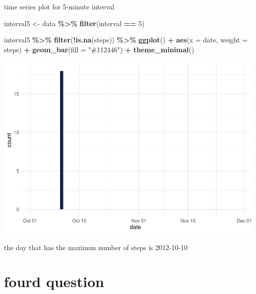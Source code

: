 \documentclass[
]{article}
\newenvironment{Shaded}{\begin{snugshade}}{\end{snugshade}}
\newcommand{\AttributeTok}[1]{\textcolor[rgb]{0.13,0.29,0.53}{#1}}
\newcommand{\DecValTok}[1]{\textcolor[rgb]{0.00,0.00,0.81}{#1}}
\newcommand{\FunctionTok}[1]{\textcolor[rgb]{0.13,0.29,0.53}{\textbf{#1}}}
\newcommand{\NormalTok}[1]{#1}
\newcommand{\OtherTok}[1]{\textcolor[rgb]{0.56,0.35,0.01}{#1}}
\newcommand{\SpecialCharTok}[1]{\textcolor[rgb]{0.81,0.36,0.00}{\textbf{#1}}}
\newcommand{\StringTok}[1]{\textcolor[rgb]{0.31,0.60,0.02}{#1}}
\begin{document}
time series plot for 5-minute interval

\begin{Shaded}
\begin{Highlighting}[]
\NormalTok{interval5 }\OtherTok{\textless{}{-}}\NormalTok{ data }\SpecialCharTok{\%\textgreater{}\%} 
        \FunctionTok{filter}\NormalTok{(interval }\SpecialCharTok{==} \DecValTok{5}\NormalTok{)}

\NormalTok{interval5 }\SpecialCharTok{\%\textgreater{}\%}
 \FunctionTok{filter}\NormalTok{(}\SpecialCharTok{!}\FunctionTok{is.na}\NormalTok{(steps)) }\SpecialCharTok{\%\textgreater{}\%}
 \FunctionTok{ggplot}\NormalTok{() }\SpecialCharTok{+}
  \FunctionTok{aes}\NormalTok{(}\AttributeTok{x =}\NormalTok{ date, }\AttributeTok{weight =}\NormalTok{ steps) }\SpecialCharTok{+}
  \FunctionTok{geom\_bar}\NormalTok{(}\AttributeTok{fill =} \StringTok{"\#112446"}\NormalTok{) }\SpecialCharTok{+}
  \FunctionTok{theme\_minimal}\NormalTok{()}
\end{Highlighting}
\end{Shaded}

\includegraphics{project1_files/figure-latex/unnamed-chunk-6-1.pdf}

the day that has the maximun number of steps is 2012-10-10

\hypertarget{fourd-question}{%
\section{fourd question}\label{fourd-question}}

\begin{Shaded}
\end{Shaded}
\end{document}
